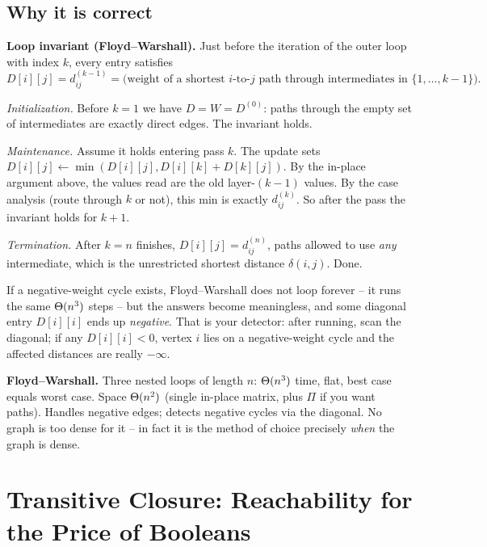 \subsection{Why it is correct}

\begin{formalbox}
\textbf{Loop invariant (Floyd--Warshall).} Just before the iteration of the
outer loop with index $k$, every entry satisfies
\[
D[i][j] = d^{(k-1)}_{ij} = \text{(weight of a shortest } i\text{-to-}j\text{ path
through intermediates in } \{1,\dots,k-1\}).
\]
\end{formalbox}

\emph{Initialization.} Before $k = 1$ we have $D = W = D^{(0)}$: paths through
the empty set of intermediates are exactly direct edges. The invariant holds.

\emph{Maintenance.} Assume it holds entering pass $k$. The update sets
$D[i][j] \leftarrow \min(D[i][j], D[i][k] + D[k][j])$. By the in-place argument
above, the values read are the old layer-$(k-1)$ values. By the case analysis
(route through $k$ or not), this min is exactly $d^{(k)}_{ij}$. So after the
pass the invariant holds for $k+1$.

\emph{Termination.} After $k = n$ finishes, $D[i][j] = d^{(n)}_{ij}$, paths
allowed to use \emph{any} intermediate, which is the unrestricted shortest
distance $\delta(i,j)$. Done.

\begin{trapbox}
If a negative-weight cycle exists, Floyd--Warshall does not loop forever -- it
runs the same $\Theta(n^3)$ steps -- but the answers become meaningless, and some
diagonal entry $D[i][i]$ ends up \emph{negative}. That is your detector: after
running, scan the diagonal; if any $D[i][i] < 0$, vertex $i$ lies on a
negative-weight cycle and the affected distances are really $-\infty$.
\end{trapbox}

\begin{complexitybox}
\textbf{Floyd--Warshall.} Three nested loops of length $n$: $\Theta(n^3)$ time,
flat, best case equals worst case. Space $\Theta(n^2)$ (single in-place matrix,
plus $\Pi$ if you want paths). Handles negative edges; detects negative cycles
via the diagonal. No graph is too dense for it -- in fact it is the method of
choice precisely \emph{when} the graph is dense.
\end{complexitybox}

\section{Transitive Closure: Reachability for the Price of Booleans}
\label{ch25:closure}

